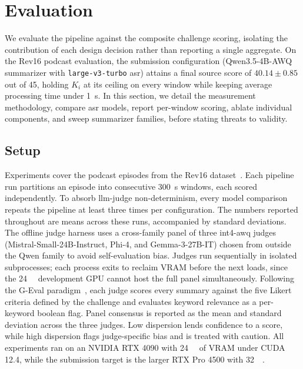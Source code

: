 \documentclass[conference,letterpaper]{IEEEtran}
\begin{document}
\section{Evaluation}
\label{sec:evaluation}

We evaluate the pipeline against the composite challenge scoring, isolating the contribution of each design decision rather than reporting a single aggregate.
On the Rev16 podcast evaluation, the submission configuration (Qwen3.5-4B-AWQ summarizer with \texttt{large-v3-turbo} \gls{asr}) attains a final source score of $40.14 \pm 0.85$ out of \num{45}, holding $K_i$ at its ceiling on every window while keeping average processing time under \SI{1}{\second}.
In this section, we detail the measurement methodology, compare \gls{asr} models, report per-window scoring, ablate individual components, and sweep summarizer families, before stating threats to validity.

\subsection{Setup}
\label{sec:eval:setup}

Experiments cover the podcast episodes from the Rev16 dataset~\cite{rev16}.
Each pipeline run partitions an episode into consecutive \SI{300}{\second} windows, each scored independently.
To absorb \gls{llm}-judge non-determinism, every model comparison repeats the pipeline at least three times per configuration.
The numbers reported throughout are means across these runs, accompanied by standard deviations.
The offline judge harness uses a cross-family panel of three int4-\gls{awq} judges (Mistral-Small-24B-Instruct, Phi-4, and Gemma-3-27B-IT) chosen from outside the Qwen family to avoid self-evaluation bias.
Judges run sequentially in isolated subprocesses; each process exits to reclaim VRAM before the next loads, since the \SI{24}{\giga\byte} development GPU cannot host the full panel simultaneously.
Following the G-Eval paradigm~\cite{geval}, each judge scores every summary against the five Likert criteria defined by the challenge and evaluates keyword relevance as a per-keyword boolean flag.
Panel consensus is reported as the mean and standard deviation across the three judges.
Low dispersion lends confidence to a score, while high dispersion flags judge-specific bias and is treated with caution.
All experiments ran on an NVIDIA RTX 4090 with \SI{24}{\giga\byte} of VRAM under CUDA 12.4, while the submission target is the larger RTX Pro 4500 with \SI{32}{\giga\byte}.
\end{document}
